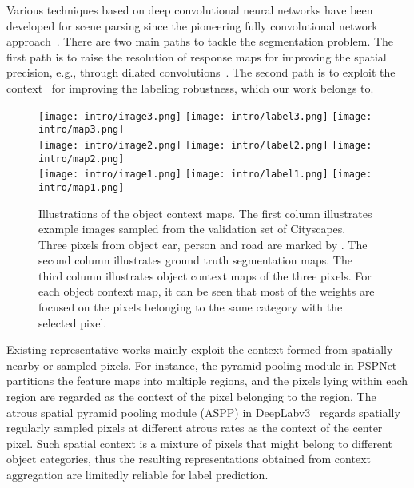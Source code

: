 \documentclass[10pt,twocolumn,letterpaper]{article}
\begin{document}
Various techniques based on deep convolutional neural networks
have been developed for scene parsing
since the pioneering fully convolutional network approach~\cite{long2015fully}.
There are two main paths to tackle the segmentation problem.
The first path is to raise the resolution
of response maps for improving the spatial precision,
e.g., through dilated convolutions~\cite{chen2018deeplab, yu2015multi}.
The second path is to exploit the context~\cite{chen2018deeplab, yu2015multi,zhao2017pyramid}
for improving the labeling robustness,
which our work belongs to.

\begin{figure}
\centering
	\texttt{[image: intro/image3.png]}
	\texttt{[image: intro/label3.png]}
	\texttt{[image: intro/map3.png]}\\
	\vspace{.05cm}
	\texttt{[image: intro/image2.png]}
	\texttt{[image: intro/label2.png]}
	\texttt{[image: intro/map2.png]}\\
	\vspace{.05cm}
	\texttt{[image: intro/image1.png]}
	\texttt{[image: intro/label1.png]}
	\texttt{[image: intro/map1.png]}
\caption{\small
Illustrations of the object context maps.
The first column illustrates example images sampled from the validation set of Cityscapes.
Three pixels from object car, person and road are marked by {}.
The second column illustrates ground truth segmentation maps.
The third column illustrates object context maps of the three pixels.
For each object context map,
it can be seen that
most of the weights are focused on
the pixels belonging to the same category with the
selected pixel.
}
\label{fig:ocmap_intro}
\end{figure}

Existing representative works
mainly exploit the context
formed from spatially nearby or sampled pixels.
For instance, the pyramid pooling module in PSPNet~\cite{zhao2017pyramid} partitions the feature maps
into multiple regions,
and the pixels lying within each region are regarded as the context
of the pixel belonging to the region.
The atrous spatial pyramid pooling module (ASPP) in DeepLabv3~\cite{chen2017rethinking}
regards spatially regularly sampled pixels
at different atrous rates as
the context of the center pixel.
Such spatial context is a mixture of pixels
that might belong to different object categories,
thus the resulting representations
obtained from context aggregation
are limitedly reliable for
label prediction.
\end{document}
